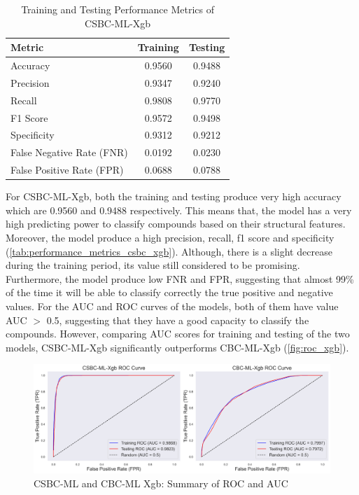 \begin{table}[h]
\centering
\small
\renewcommand{\arraystretch}{1.2} %

\begin{tabular}{l c c}
\hline
\textbf{Metric} & \textbf{Training} & \textbf{Testing} \\
\hline
Accuracy & 0.9560 & 0.9488 \\
Precision & 0.9347 & 0.9240 \\
Recall & 0.9808 & 0.9770 \\
F1 Score & 0.9572 & 0.9498 \\
Specificity & 0.9312 & 0.9212 \\
False Negative Rate (FNR) & 0.0192 & 0.0230 \\
False Positive Rate (FPR) & 0.0688 & 0.0788 \\
\hline
\end{tabular}

\caption{Training and Testing Performance Metrics of CSBC-ML-Xgb}
\label{tab:performance_metrics_csbc_xgb}
\end{table}

For CSBC-ML-Xgb, both the training and testing produce very high accuracy which are 0.9560 and 0.9488 respectively. This means that, the model has a very high predicting power to classify compounds based on their structural features. Moreover, the model produce a high precision, recall, f1 score  and specificity (\autoref{tab:performance_metrics_csbc_xgb}). Although, there is a slight decrease during the training period, its value still considered to be promising. Furthermore, the model produce low FNR and FPR, suggesting that almost 99\% of the time it will be able to classify correctly the true positive and negative values. For the AUC and ROC curves of the models, both of them have value AUC $>$ 0.5, suggesting that they have a good capacity to classify the compounds. However, comparing AUC scores for training and testing of the two models, CSBC-ML-Xgb significantly outperforms CBC-ML-Xgb (\autoref{fig:roc_xgb}). 

\begin{figure}[h] %
    \centering
    \includegraphics[scale=0.4]{combined_roc_xgb.png} %
    \caption{CSBC-ML and CBC-ML Xgb: Summary of ROC and AUC }
    \label{fig:roc_xgb} %
\end{figure}

